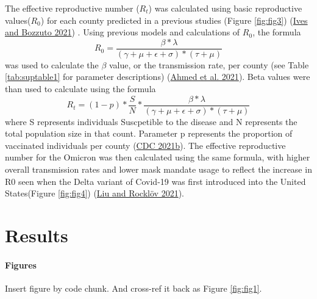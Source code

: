 \documentclass[
  12pt,
]{article}
\begin{document}
The effective reproductive number (\(R_t\)) was calculated using basic reproductive values(\(R_0\)) for each county predicted in a previous studies (Figure \ref{fig:fig3}) (\protect\hyperlink{ref-ives_estimating_2021}{Ives and Bozzuto 2021}) . Using previous models and calculations of \(R_0\), the formula
\[R_0 = \frac{\beta*\lambda}{(\gamma+\mu+\epsilon+\sigma)*(\tau+\mu)}\]
was used to calculate the \(\beta\) value, or the transmission rate, per county (see Table \ref{tab:suptable1} for parameter descriptions) (\protect\hyperlink{ref-ahmed_mathematical_2021}{Ahmed et al. 2021}). Beta values were than used to calculate using the formula
\[R_t = (1-p)*\frac{S}{N}*\frac{\beta*\lambda}{(\gamma+\mu+\epsilon+\sigma)*(\tau+\mu)}\]
where S represents individuals Suscpetible to the disease and N represents the total population size in that count. Parameter p represents the proportion of vaccinated individuals per county (\protect\hyperlink{ref-cdc_covid-19_2021}{CDC 2021b}). The effective reproductive number for the Omicron was then calculated using the same formula, with higher overall transmission rates and lower mask mandate usage to reflect the increase in R0 seen when the Delta variant of Covid-19 was first introduced into the United States(Figure \ref{fig:fig4}) (\protect\hyperlink{ref-liu_reproductive_2021}{Liu and Rocklöv 2021}).

\hypertarget{results}{%
\section{Results}\label{results}}

\hypertarget{figures}{%
\paragraph{Figures}\label{figures}}

Insert figure by code chunk. And cross-ref it back as Figure \ref{fig:fig1}.
\end{document}
